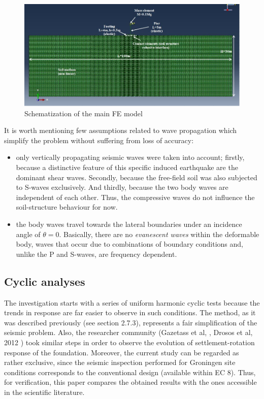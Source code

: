 		\begin{figure}[!h]
			\centering
			\includegraphics[width=0.9\linewidth]{"mainmodel"}
			\caption{Schematization of the main FE model}
			\label{mainM}
		\end{figure}
		
	It is worth mentioning few assumptions related to wave propagation which simplify the problem without suffering from loss of accuracy:
	\begin{itemize}
		\item only vertically propagating seismic waves were taken into account; firstly, because a distinctive feature of this specific induced earthquake are the dominant shear waves. Secondly, because the free-field soil was also subjected to S-waves exclusively. And thirdly, because the two body waves are independent of each other. Thus, the compressive waves do not influence the soil-structure behaviour for now.
		\item the body waves travel towards the lateral boundaries under an incidence angle of $\theta = 0$. Basically, there are no \textit{evanescent waves} within the deformable body, waves that occur due to combinations of boundary conditions and, unlike the P and S-waves, are frequency dependent.
	\end{itemize}
	
\subsection{Cyclic analyses}
	The investigation starts with a series of  uniform harmonic cyclic tests because the trends in response are far easier to observe in such conditions. The method, as it was described previously (see section 2.7.3), represents a fair simplification of the seismic \mbox{problem}. Also, the researcher community (Gazetass et al, \cite{gazetas2004seismic}, Drosos et al, 2012 \cite{drosos2012soil}) took similar steps in order to observe the evolution of settlement-rotation response of the foundation. Moreover, the current study can be regarded as rather exclusive, since the seismic inspection performed for Groningen site conditions corresponds to the conventional design (available within EC 8). Thus, for verification, this paper compares the obtained results with the ones accessible in the scientific literature.

